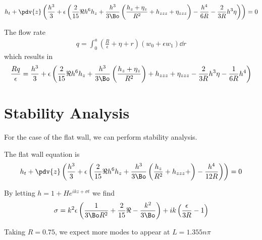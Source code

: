 \documentclass[12pt]{article}
\begin{document}
\begin{align}
h_t + \pdv{z}\left(\frac{h^3}{3} +\epsilon\left(\frac{2}{15}\Re h^6 h_z + \frac{h^3}{3\Bo}\left(\frac{h_z+ \eta_z}{R^2} + h_{zzz}+ \eta_{zzz}\right)- \frac{h^4}{6R}- \frac{2}{3R}h^3\eta\right)\right)=0
\end{align}

The flow rate 
\begin{align}
q = \int_{0}^{a}{\left(\frac{R}{\epsilon}+\eta+r\right)(w_0 + \epsilon w_1)\dd{r}}
\end{align}
which results in 
\begin{align}
\frac{Rq}{\epsilon} = \frac{h^3}{3}+\epsilon\left(\frac{2}{15}\Re h^6h_z + \frac{h^3}{3\Bo}\left(\frac{h_z+\eta_z}{R^2}\right)+h_{zzz} + \eta_{zzz}- \frac{2}{3R}h^3\eta-\frac{1}{6R}h^4\right)
\end{align}


\section{Stability Analysis}

For the case of  the flat wall, we can perform stability analysis.

The flat wall equation is 
\begin{align}
h_t + \pdv{z}\left(\frac{h^3}{3} +\epsilon\left(\frac{2}{15}\Re h^6 h_z + \frac{h^3}{3\Bo}\left(\frac{h_z}{R^2} + h_{zzz}+ \right)- \frac{h^4}{12R}\right)\right)=0
\end{align}

By letting $h = 1 + He^{ikz + \sigma t}$ we find 
\begin{align}
\sigma = k^2\epsilon\left(\frac{1}{3\Bo R^2}+\frac{2}{15}\Re  - \frac{k^2}{3\Bo}\right)+ik\left(\frac{\epsilon}{3R}-1\right)
\end{align}

Taking $R = 0.75$, we expect more modes to appear at $L = 1.355 n \pi$




\end{document}
